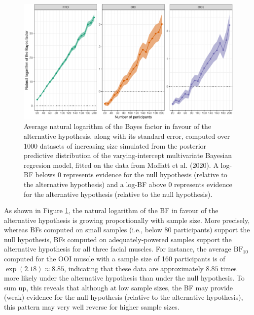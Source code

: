 \documentclass[
  english,
  man, donotrepeattitle,floatsintext]{apa6}
\begin{document}
\begin{figure}[!htb]

{\centering \includegraphics[width=1\linewidth]{manuscript_files/figure-latex/simulated-power-1} 

}

\caption{Average natural logarithm of the Bayes factor in favour of the alternative hypothesis, along with its standard error, computed over 1000 datasets of increasing size simulated from the posterior predictive distribution of the varying-intercept multivariate Bayesian regresion model, fitted on the data from Moffatt et al. (2020). A log-BF belows 0 represents evidence for the null hypothesis (relative to the alternative hypothesis) and a log-BF above 0 represents evidence for the alternative hypothesis (relative to the null hypothesis).}\label{fig:simulated-power}
\end{figure}

As shown in Figure \ref{fig:simulated-power}, the natural logarithm of the BF in favour of the alternative hypothesis is growing proportionally with sample size. More precisely, whereas BFs computed on small samples (i.e., below 80 participants) support the null hypothesis, BFs computed on adequately-powered samples support the alternative hypothesis for all three facial muscles. For instance, the average \(\text{BF}_{10}\) computed for the OOI muscle with a sample size of 160 participants is of \(\exp(2.18) \approx 8.85\), indicating that these data are approximately \(8.85\) times more likely under the alternative hypothesis than under the null hypothesis. To sum up, this reveals that although at low sample sizes, the BF may provide (weak) evidence for the null hypothesis (relative to the alternative hypothesis), this pattern may very well reverse for higher sample sizes.
\end{document}
